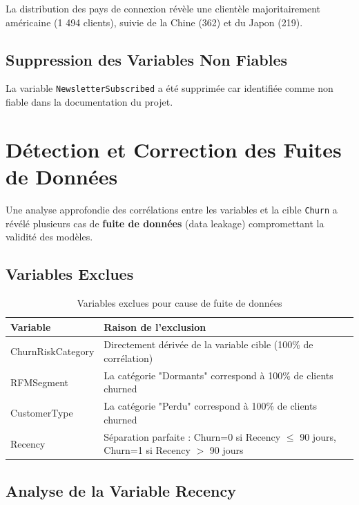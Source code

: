 \documentclass[11pt,a4paper]{article}
\begin{document}
La distribution des pays de connexion révèle une clientèle majoritairement américaine (1 494 clients), suivie de la Chine (362) et du Japon (219).

\subsection{Suppression des Variables Non Fiables}

La variable \texttt{NewsletterSubscribed} a été supprimée car identifiée comme non fiable dans la documentation du projet.

\section{Détection et Correction des Fuites de Données}

Une analyse approfondie des corrélations entre les variables et la cible \texttt{Churn} a révélé plusieurs cas de \textbf{fuite de données} (data leakage) compromettant la validité des modèles.

\subsection{Variables Exclues}

\begin{table}[H]
\centering
\begin{tabular}{L{3.5cm}L{9cm}}
\toprule
\textbf{Variable} & \textbf{Raison de l'exclusion} \\
\midrule
ChurnRiskCategory & Directement dérivée de la variable cible (100\% de corrélation) \\
RFMSegment & La catégorie "Dormants" correspond à 100\% de clients churned \\
CustomerType & La catégorie "Perdu" correspond à 100\% de clients churned \\
Recency & Séparation parfaite : Churn=0 si Recency $\leq$ 90 jours, Churn=1 si Recency $>$ 90 jours \\
\bottomrule
\end{tabular}
\caption{Variables exclues pour cause de fuite de données}
\end{table}

\subsection{Analyse de la Variable Recency}
\end{document}
